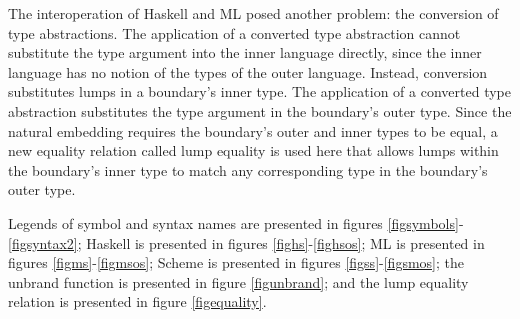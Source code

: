 The interoperation of Haskell and ML posed another problem: the conversion of type abstractions. The application of a converted type abstraction cannot substitute the type argument into the inner language directly, since the inner language has no notion of the types of the outer language. Instead, conversion substitutes lumps in a boundary's inner type. The application of a converted type abstraction substitutes the type argument in the boundary's outer type. Since the natural embedding \cite{matthews07} requires the boundary's outer and inner types to be equal, a new equality relation called lump equality is used here that allows lumps within the boundary's inner type to match any corresponding type in the boundary's outer type.

Legends of symbol and syntax names are presented in figures \ref{figsymbols}-\ref{figsyntax2}; Haskell is presented in figures \ref{fighs}-\ref{fighsos}; ML is presented in figures \ref{figms}-\ref{figmsos}; Scheme is presented in figures \ref{figss}-\ref{figsmos}; the unbrand function is presented in figure \ref{figunbrand}; and the lump equality relation is presented in figure \ref{figequality}.

\clearpage



\clearpage



\clearpage



\clearpage



\clearpage



\clearpage



\clearpage



\clearpage



\clearpage



\clearpage



\clearpage



